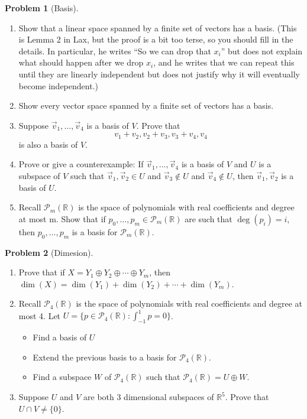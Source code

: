 \documentclass[12pt]{article}
\theoremstyle{definition}
\newtheorem{problem}{Problem}
\begin{document}
\begin{problem}[Basis]~
\begin{enumerate}
    \item Show that a linear space spanned by a finite set of vectors has a basis. (This is Lemma 2 in Lax, but the proof is a bit too terse, so you should fill in the details. In particular, he writes ``So we can drop that $x_i$'' but does not explain what should happen after we drop $x_i$, and he writes that we can repeat this until they are linearly independent but does not justify why it will eventually become independent.)
    \item Show every vector space spanned by a finite set of vectors has a basis.
    \item Suppose $\vec{v}_1, \ldots, \vec{v}_4$ is a basis of $V$. Prove that 
    \[ v_1 + v_2, v_2+v_3, v_3+v_4, v_4 \]
    is also a basis of $V$.
    \item Prove or give a counterexample: If $\vec{v}_1, \ldots, \vec{v}_4$ is a basis of $V$ and $U$ is a
    subspace of $V$ such that $\vec{v}_1, \vec{v}_2\in U$ and $\vec{v}_3\not\in U$ and $\vec{v}_4\not\in U$, then $\vec{v}_1, \vec{v}_2$ is a basis of $U$.
    \item Recall $\mathcal{P}_m(\mathbb{R})$ is the space of polynomials with real coefficients and degree at most m. Show that if $p_0, \ldots, p_m\in \mathcal{P}_m(\mathbb{R})$ are such that $\deg(p_i) = i$, then $p_0, \ldots, p_m$ is a basis for $\mathcal{P}_m(\mathbb{R})$.
\end{enumerate}
\end{problem}

\begin{problem}[Dimesion]~
\begin{enumerate}
    \item Prove that if $X = Y_1 \oplus Y_2 \oplus \cdots \oplus Y_m$, then $\dim(X) = \dim(Y_1) + \dim(Y_2) + \cdots + \dim(Y_m)$.
    \item Recall $\mathcal{P}_4(\mathbb{R})$ is the space of polynomials with real coefficients and degree at most 4. 
    Let $U = \{ p \in \mathcal{P}_4(\mathbb{R}) : \int_{-1}^{1} p = 0\}$. 
    \begin{itemize}
        \item Find a basis of $U$
        \item Extend the previous basis to a basis for $\mathcal{P}_4(\mathbb{R})$.
        \item Find a subspace $W$ of $\mathcal{P}_4(\mathbb{R})$ such that $\mathcal{P}_4(\mathbb{R}) = U \oplus W$.
    \end{itemize}
    \item Suppose $U$ and $V$ are both 3 dimensional subspaces of $\mathbb{R}^5$. Prove that $U \cap V \neq \{ 0 \} $.
\end{enumerate}
\end{problem}
\end{document}
